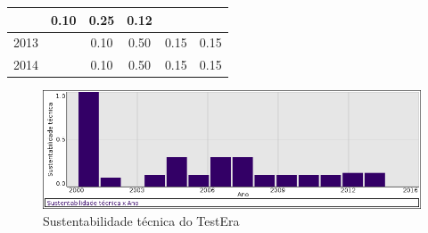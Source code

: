 \begin{table}[H]
\begin{tabular}{| l | c | c | c | c | c |}
          &
          0.10
          &
          0.25
          &
          0.12
          &
          \\
\hline
            2013
          &
          
          &
          0.10
          &
          0.50
          &
          0.15
          &
            {\color{red} 0.15}
          \\
\hline
            2014
          &
          
          &
          0.10
          &
          0.50
          &
          0.15
          &
            {\color{red} 0.15}
          \\
\hline
\end{tabular}
\end{table}

\begin{figure}[h]
  \center
  \includegraphics[scale=0.50]{imagens/softwares-charts/testera.png}
  \caption{Sustentabilidade técnica do TestEra}
\end{figure}


